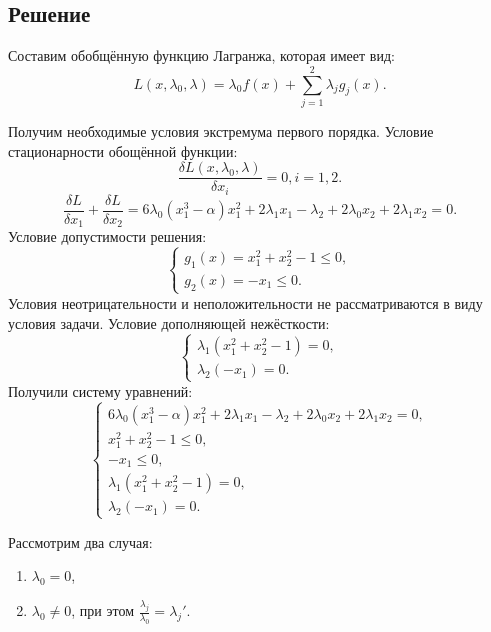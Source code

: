 \documentclass[12pt,a4paper,oneside]{extarticle}
\begin{document}
    \subsection{Решение}
        Составим обобщённую функцию Лагранжа, которая имеет вид:
        $$L(x,\lambda_0, \lambda) = \lambda_0f(x)+\sum_{j=1}^2\lambda_jg_j(x).$$

        Получим необходимые условия экстремума первого порядка. Условие стационарности обощённой функции:
        $$\frac{\delta L(x,\lambda_0, \lambda)}{\delta x_i}=0, i=1,2.$$
        $$\frac{\delta L}{\delta x_1} + \frac{\delta L}{\delta x_2} = 6\lambda_0(x_1^3 - \alpha)x_1^2 + 2\lambda_1x_1 - \lambda_2 +2\lambda_0x_2 + 2\lambda_1x_2 = 0.$$
        Условие допустимости решения:
        \begin{equation*}
            \begin{cases}
               g_1(x) = x_1^2+x_2^2 - 1 \le 0, \\
               g_2(x) = -x_1 \le 0.
            \end{cases}
        \end{equation*}
        Условия неотрицательности и неположительности не рассматриваются в виду условия задачи. Условие дополняющей нежёсткости:
        \begin{equation*}
            \begin{cases}
                \lambda_1(x_1^2+x_2^2 - 1) = 0, \\
                \lambda_2(-x_1) = 0.
            \end{cases}
        \end{equation*}
        Получили систему уравнений:
        \begin{equation*}
            \begin{cases}
                6\lambda_0(x_1^3 - \alpha)x_1^2 + 2\lambda_1x_1 - \lambda_2 +2\lambda_0x_2 + 2\lambda_1x_2 = 0, \\
                x_1^2+x_2^2 - 1 \le 0, \\
                -x_1 \le 0, \\
                \lambda_1(x_1^2+x_2^2 - 1) = 0, \\
                \lambda_2(-x_1) = 0.
            \end{cases}
        \end{equation*}

        Рассмотрим два случая:
        \begin{enumerate}
            \item $\lambda_0 = 0$,
            \item $\lambda_0 \neq 0$, при этом $\frac{\lambda_j}{\lambda_0} = \lambda_j'$.
        \end{enumerate}
\end{document}
